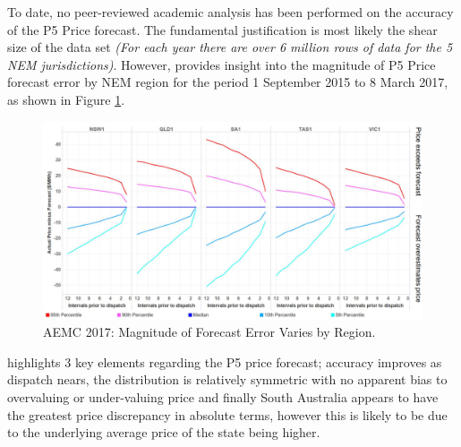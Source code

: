 To date, no peer-reviewed academic analysis has been performed on the accuracy of the P5 Price forecast. The fundamental justification is most likely the shear size of the data set \textit{(For each year there are over 6 million rows of data for the 5 NEM jurisdictions)}. However, \parencite{AEMCMarch2017} provides insight into the magnitude of P5 Price forecast error by NEM region for the period 1 September 2015 to 8 March 2017, as shown in Figure \ref{fig:p5_aemc}. 
\begin{figure}[H]
\centering
\includegraphics[width=1\textwidth]{Pictures/Chapter2/AEMC_P5_Error.PNG}
\caption{AEMC 2017: Magnitude of Forecast Error Varies by Region.}
\label{fig:p5_aemc}
\end{figure}
\parencite{AEMCMarch2017} highlights 3 key elements regarding the P5 price forecast; accuracy improves as dispatch nears, the distribution is relatively symmetric with no apparent bias to overvaluing or under-valuing price and finally South Australia appears to have the greatest price discrepancy in absolute terms, however this is likely to be due to the underlying average price of the state being higher.


